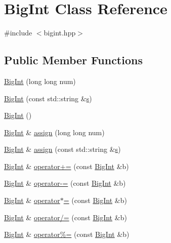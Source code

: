 \hypertarget{class_big_int}{}\section{Big\+Int Class Reference}
\label{class_big_int}


{\ttfamily \#include $<$bigint.\+hpp$>$}

\subsection*{Public Member Functions}
\begin{DoxyCompactItemize}
\item 
\hyperlink{class_big_int_a4421e6c1883874512f1b04543dafc64a}{Big\+Int} (long long num)
\item 
\hyperlink{class_big_int_abe13ffcbf871ddb97365a73120ca0b6f}{Big\+Int} (const std\+::string \&\hyperlink{preprocessortest_8cpp_a10d1ea193b80aa2128e080646057d11c}{s})
\item 
\hyperlink{class_big_int_af677021c0987fc2a48da06837ed29c58}{Big\+Int} ()
\item 
\hyperlink{class_big_int}{Big\+Int} \& \hyperlink{class_big_int_a43652944006a9ace4fa3d8e1c0ed3213}{assign} (long long num)
\item 
\hyperlink{class_big_int}{Big\+Int} \& \hyperlink{class_big_int_acc4942cf0af7096ec328735c75f8fcfe}{assign} (const std\+::string \&\hyperlink{preprocessortest_8cpp_a10d1ea193b80aa2128e080646057d11c}{s})
\item 
\hyperlink{class_big_int}{Big\+Int} \& \hyperlink{class_big_int_a5768b8d21f3cc80a85cdea09a8769a22}{operator+=} (const \hyperlink{class_big_int}{Big\+Int} \&b)
\item 
\hyperlink{class_big_int}{Big\+Int} \& \hyperlink{class_big_int_a164befb196d794282a927e1a490bb939}{operator-\/=} (const \hyperlink{class_big_int}{Big\+Int} \&b)
\item 
\hyperlink{class_big_int}{Big\+Int} \& \hyperlink{class_big_int_aaf4a32e323d4f67fc6c04462ed812461}{operator$\ast$=} (const \hyperlink{class_big_int}{Big\+Int} \&b)
\item 
\hyperlink{class_big_int}{Big\+Int} \& \hyperlink{class_big_int_a72d43b327dc95e500d71c667f891cbb8}{operator/=} (const \hyperlink{class_big_int}{Big\+Int} \&b)
\item 
\hyperlink{class_big_int}{Big\+Int} \& \hyperlink{class_big_int_aa88327d018c8dc6fbb006e1b8b9ce964}{operator\%=} (const \hyperlink{class_big_int}{Big\+Int} \&b)
\item 

\end{DoxyCompactItemize}
